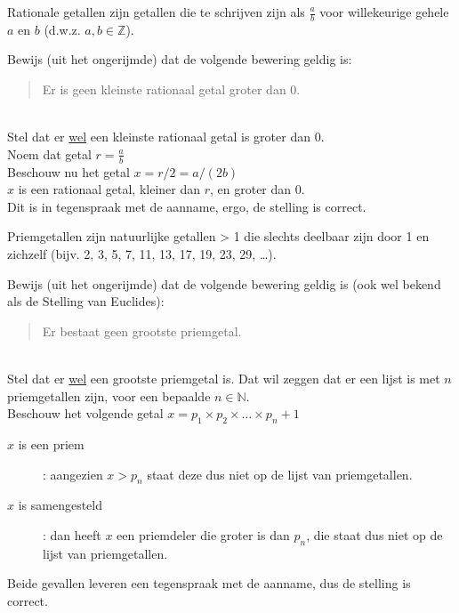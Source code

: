 \begin{answer}[Optioneel]
Rationale getallen zijn getallen die te schrijven zijn als $\frac{a}{b}$ voor willekeurige gehele $a$ en $b$ (d.w.z. $a,b \in \mathbb{Z}$).

Bewijs (uit het ongerijmde) dat de volgende bewering geldig is:
\begin{quote}
    Er is geen kleinste rationaal getal groter dan 0.
\end{quote}\mbox{}\\[2.5pt]
Stel dat er \underline{wel} een kleinste rationaal getal is groter dan 0.\\[2.5pt]
Noem dat getal $r=\frac{a}{b}$\\[2.5pt]
Beschouw nu het getal $x=r/2=a/(2b)$\\[2.5pt]
$x$ is een rationaal getal, kleiner dan $r$, en groter dan 0.\\[2.5pt]
Dit is in tegenspraak met de aanname, ergo, de stelling is correct.
\end{answer}

\begin{answer}[Optioneel]
Priemgetallen zijn natuurlijke getallen > 1 die slechts deelbaar zijn door 1 en zichzelf (bijv. 2, 3, 5, 7, 11, 13, 17, 19, 23, 29, \ldots).

Bewijs (uit het ongerijmde) dat de volgende bewering geldig is (ook wel bekend als de Stelling van Euclides):
\begin{quote}
    Er bestaat geen grootste priemgetal.
\end{quote}\mbox{}\\[2.5pt]
Stel dat er \underline{wel} een grootste priemgetal is. Dat wil zeggen dat er een lijst is met $n$ priemgetallen zijn, voor een bepaalde $n\in\mathbb{N}$.\\[2.5pt]
Beschouw het volgende getal $x=p_1\times p_2\times\ldots\times p_n+1$
\begin{description}
\item[$x$ is een priem]: aangezien $x>p_n$ staat deze dus niet op de lijst van priemgetallen.
\item[$x$ is samengesteld]: dan heeft $x$ een priemdeler die groter is dan $p_n$, die staat dus niet op de lijst van priemgetallen.
\end{description}
Beide gevallen leveren een tegenspraak met de aanname, dus de stelling is correct.
\end{answer}

